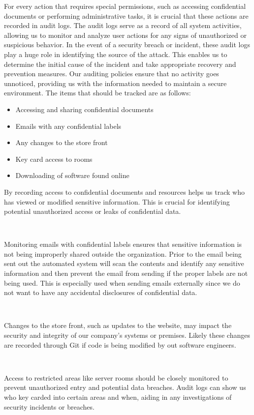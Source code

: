 \documentclass[12pt,a4paper]{report}
\begin{document}
For every action that requires special permissions, such as accessing confidential documents or performing administrative tasks, it is crucial that these actions are recorded in audit logs. 
The audit logs serve as a record of all system activities, allowing us to monitor and analyze user actions for any signs of unauthorized or suspicious behavior.
In the event of a security breach or incident, these audit logs play a huge role in identifying the source of the attack.
This enables us to determine the initial cause of the incident and take appropriate recovery and prevention measures.
Our auditing policies ensure that no activity goes unnoticed, providing us with the information needed to maintain a secure environment.
The items that should be tracked are as follows:
\begin{itemize}
 \item Accessing and sharing confidential documents
 \item Emails with any confidential labels
 \item Any changes to the store front
 \item Key card access to rooms
 \item Downloading of software found online
\end{itemize}

By recording access to confidential documents and resources helps us track who has viewed or modified sensitive information.
This is crucial for identifying potential unauthorized access or leaks of confidential data.

\

Monitoring emails with confidential labels ensures that sensitive information is not being improperly shared outside the organization. 
Prior to the email being sent out the automated system will scan the contents and identify any sensitive information and then prevent the email from sending if the proper labels are not being used.
This is especially used when sending emails externally since we do not want to have any accidental disclosures of confidential data.

\

Changes to the store front, such as updates to the website, may impact the security and integrity of our company's systems or premises.
Likely these changes are recorded through Git if code is being modified by out software engineers.

\

Access to restricted areas like server rooms should be closely monitored to prevent unauthorized entry and potential data breaches. 
Audit logs can show us who key carded into certain areas and when, aiding in any investigations of security incidents or breaches.
\end{document}
